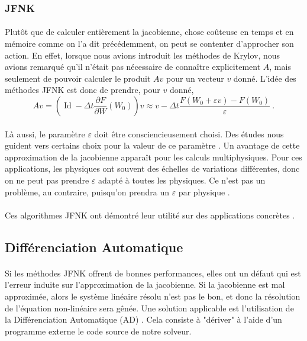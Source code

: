     \subsubsection{JFNK}

      \paragraph{}
      Plutôt que de calculer entièrement la jacobienne, chose coûteuse en temps et en mémoire comme on l'a dit précédemment, on peut se contenter d'approcher son action.
      En effet, lorsque nous avions introduit les méthodes de Krylov, nous avions remarqué qu'il n'était pas nécessaire de connaître explicitement $A$, mais seulement de pouvoir calculer le produit $Av$ pour un vecteur $v$ donné.
      L'idée des méthodes JFNK est donc de prendre, pour $v$ donné,
      \[Av = \left(\operatorname{Id} - \Delta t\frac{\partial F}{\partial W}\left(W_0\right)\right)v \approx v - \Delta t\frac{F\left(W_0 + \varepsilon v\right) - F\left(W_0\right)}{\varepsilon}\ .\]

      \paragraph{}
      Là aussi, le paramètre $\varepsilon$ doit être consciencieusement choisi.
      Des études nous guident vers certains choix pour la valeur de ce paramètre \cite{KnollKeyes2004}.
      Un avantage de cette approximation de la jacobienne apparaît pour les calculs multiphysiques.
      Pour ces applications, les physiques ont souvent des échelles de variations différentes, donc on ne peut pas prendre $\varepsilon$ adapté à toutes les physiques.
      Ce n'est pas un problème, au contraire, puisqu'on prendra un $\varepsilon$ par physique \cite{Turpault2003}.

      \paragraph{}
      Ces algorithmes JFNK ont démontré leur utilité sur des applications concrètes \cite{LiuZhangZhongEtAl2015, FrancoCamierAndrejEtAl2020}.


  \subsection{Différenciation Automatique}

    \paragraph{}
    Si les méthodes JFNK offrent de bonnes performances, elles ont un défaut qui est l'erreur induite sur l'approximation de la jacobienne.
    Si la jacobienne est mal approximée, alors le système linéaire résolu n'est pas le bon, et donc la résolution de l'équation non-linéaire sera gênée.
    Une solution applicable est l'utilisation de la Différenciation Automatique (AD) \cite{Griewank2000}.
    Cela consiste à "dériver" à l'aide d'un programme externe \cite{HascoeetPascual2012} le code source de notre solveur.

